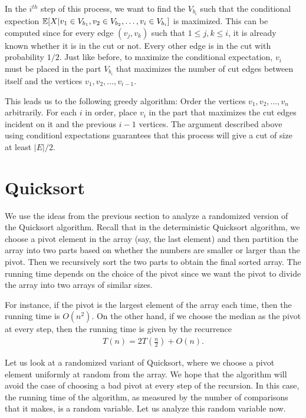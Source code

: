 In the $i^{th}$ step of this process, we want to find the $V_{b_i}$ such that
the conditional expection
$\mathbb{E}[X|v_1 \in V_{b_1}, v_2\in V_{b_2}, \ldots, v_i\in V_{b_i}]$ is
maximized. This can be computed since for every edge $(v_j,v_k)$ such that
$1\leq j,k\leq i$, it is already known whether it is in the cut or not. Every
other edge is in the cut with probability $1/2$. Just like before, to maximize
the conditional expectation, $v_i$ must be placed in the part $V_{b_i}$ that
maximizes the number of cut edges between itself and the vertices
$v_1, v_2, \ldots, v_{i-1}$.

This leads us to the following greedy algorithm: Order the vertices
$v_1, v_2, \ldots, v_n$ arbitrarily. For each $i$ in order, place $v_i$ in the
part that maximizes the cut edges incident on it and the previous $i-1$
vertices. The argument described above using conditionl expectations guarantees
that this process will give a cut of size at least $|E|/2$.

\section{Quicksort}
We use the ideas from the previous section to analyze a randomized version of the Quicksort algorithm. Recall that in the deterministic Quicksort algorithm, we choose a pivot element in the array (say, the last element) and then partition the array into two parts based on whether the numbers are smaller or larger than the pivot. Then we recursively sort the two parts to obtain the final sorted array. The running time depends on the choice of the pivot since we want the pivot to divide the array into two arrays of similar sizes. 

For instance, if the pivot is the largest element of the array each time, then the running time is $O(n^2)$. On the other hand, if we choose the median as the pivot at every step, then the running time is given by the recurrence
\begin{align*}
	T(n) = 2T\left( \frac{n}{2} \right) + O(n).
\end{align*}

Let us look at a randomized variant of Quicksort, where we choose a pivot element uniformly at random from the array. We hope that the algorithm will avoid the case of choosing a bad pivot at every step of the recursion. In this case, the running time of the algorithm, as measured by the number of comparisons that it makes, is a random variable. Let us analyze this random variable now.

